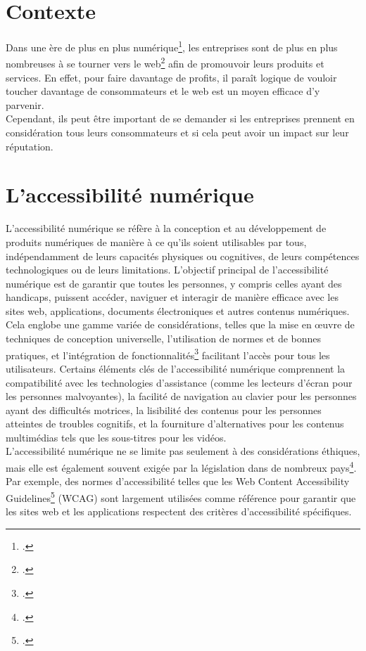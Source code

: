 \documentclass[12pt, a4paper]{report}
\begin{document}
\section{Contexte}

Dans une ère de plus en plus numérique\footcite{noauthor_ere_2023}, les entreprises sont de plus en plus nombreuses à se tourner vers le web\footcite{noauthor_total_nodate} afin de promouvoir leurs produits et services. En effet, pour faire davantage de profits, il paraît logique de vouloir toucher davantage de consommateurs et le web est un moyen efficace d'y parvenir.\\

Cependant, ils peut être important de se demander si les entreprises prennent en considération tous leurs consommateurs et si cela peut avoir un impact sur leur réputation.

\section{L'accessibilité numérique}

L'accessibilité numérique se réfère à la conception et au développement de produits numériques de manière à ce qu'ils soient utilisables par tous, indépendamment de leurs capacités physiques ou cognitives, de leurs compétences technologiques ou de leurs limitations. L'objectif principal de l'accessibilité numérique est de garantir que toutes les personnes, y compris celles ayant des handicaps, puissent accéder, naviguer et interagir de manière efficace avec les sites web, applications, documents électroniques et autres contenus numériques.\\

Cela englobe une gamme variée de considérations, telles que la mise en œuvre de techniques de conception universelle, l'utilisation de normes et de bonnes pratiques, et l'intégration de fonctionnalités\footcite{alajarmeh_non-visual_2021} facilitant l'accès pour tous les utilisateurs. Certains éléments clés de l'accessibilité numérique comprennent la compatibilité avec les technologies d'assistance (comme les lecteurs d'écran pour les personnes malvoyantes), la facilité de navigation au clavier pour les personnes ayant des difficultés motrices, la lisibilité des contenus pour les personnes atteintes de troubles cognitifs, et la fourniture d'alternatives pour les contenus multimédias tels que les sous-titres pour les vidéos.\\

L'accessibilité numérique ne se limite pas seulement à des considérations éthiques, mais elle est également souvent exigée par la législation dans de nombreux pays\footcite{noauthor_accessibilite_nodate}. Par exemple, des normes d'accessibilité telles que les Web Content Accessibility Guidelines\footcite{noauthor_criteres_nodate} (WCAG) sont largement utilisées comme référence pour garantir que les sites web et les applications respectent des critères d'accessibilité spécifiques.\\
\end{document}
